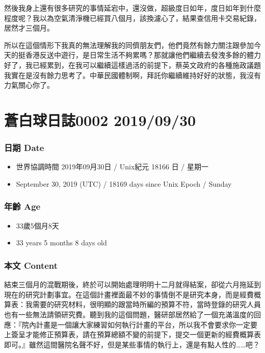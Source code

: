 \documentclass[a5paper, 12pt
]{book}
\providecommand{\tightlist}{%
  \setlength{\itemsep}{0pt}\setlength{\parskip}{0pt}}
\begin{document}
然後我身上還有很多研究的事情延宕中，還沒做，超級度日如年，度日如年到什麼程度呢？我以為空氣清淨機已經買八個月，該換濾心了，結果查信用卡交易紀錄，居然才三個月。

所以在這個情形下我真的無法理解我的同儕朋友們，他們竟然有餘力關注跟參加今天的挺香港反送中遊行，是日常生活不夠累嗎？那就讓他們繼續去發洩多餘的體力好了，我已經累到，在我可以繼續這樣過活的前提下，蔡英文政府的各種施政議題我實在是沒有餘力思考了。中華民國體制啊，拜託你繼續維持好好的狀態，我沒有力氣關心你了。

\hypertarget{ux84bcux767dux7403ux65e5ux8a8c0002-20190930}{%
\section{蒼白球日誌0002
2019/09/30}\label{ux84bcux767dux7403ux65e5ux8a8c0002-20190930}}

\hypertarget{ux65e5ux671f-date-1}{%
\subsubsection{日期 Date}\label{ux65e5ux671f-date-1}}

\begin{itemize}
\tightlist
\item
  世界協調時間 2019年09月30日 / Unix紀元 18166 日 / 星期一
\item
  September 30, 2019 (UTC) / 18169 days since Unix Epoch / Sunday
\end{itemize}

\hypertarget{ux5e74ux9f61-age-1}{%
\subsubsection{年齡 Age}\label{ux5e74ux9f61-age-1}}

\begin{itemize}
\tightlist
\item
  33歲5個月8天
\item
  33 years 5 months 8 days old
\end{itemize}

\hypertarget{ux672cux6587-content-1}{%
\subsubsection{本文 Content}\label{ux672cux6587-content-1}}

結束三個月的混戰期後，終於可以開始處理明明十二月就得結案，卻從六月拖延到現在的研究計劃事宜。在這個計畫裡面最不妙的事情倒不是研究本身，而是經費概算表：我需要的研究材料，很明顯的跟當時所編的預算不符，當時登錄的研究人員也有一些無法請領研究費。聽到我的這個問題，醫研部居然給了一個充滿溫度的回應：『院內計畫是一個讓大家練習如何執行計畫的平台，所以我不會要求你一定要上簽呈才能修正預算表，請在預算總額不變的前提下，提交一個更新的經費概算表即可。』雖然這間醫院名聲不好，但是某些事情的執行上，還是有點人性的\ldots\ldots 吧？
\end{document}
